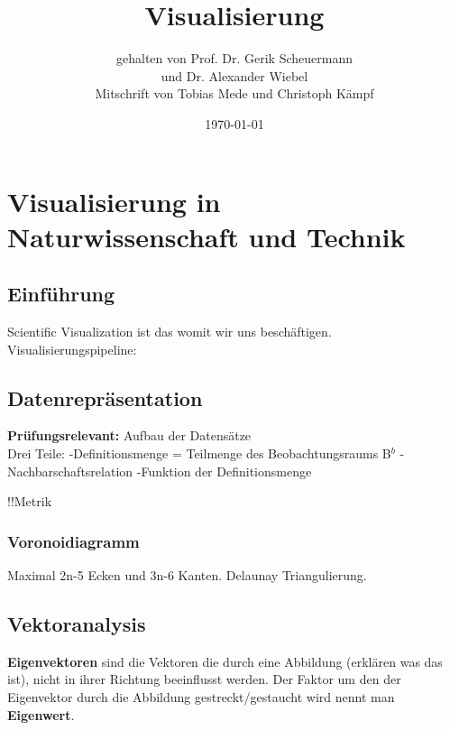 \documentclass[12pt,a4paper,oneside,normalheadings,abstracton,liststotoc,bibtotoc,titlepage,pdftex]{scrbook}
\begin{document}

\titlehead{Universität Leipzig\\Fakultät für Fakultät für Mathematik und Informatik}
\subject{Vorlesungsmitschrift WiSe 2010}
\title{Visualisierung}
\author{gehalten von Prof. Dr. Gerik Scheuermann\\
und Dr. Alexander Wiebel \\
Mitschrift von Tobias Mede und Christoph Kämpf}
\date{\today}

\maketitle[1]


\tableofcontents
\pagebreak


\chapter{Visualisierung in Naturwissenschaft und Technik}

\section{Einführung}
Scientific Visualization ist das womit wir uns beschäftigen.
Visualisierungspipeline:


\section{Datenrepräsentation}
\textbf{Prüfungsrelevant:} Aufbau der Datensätze\\


Drei Teile:
-Definitionsmenge = Teilmenge des Beobachtungsraums B$^b$
-Nachbarschaftsrelation
-Funktion der Definitionsmenge

!!Metrik
\subsection{Voronoidiagramm}
Maximal 2n-5 Ecken und 3n-6 Kanten. Delaunay Triangulierung.

\section{Vektoranalysis}
\textbf{Eigenvektoren} sind die Vektoren die durch eine Abbildung (erklären was das ist), nicht in ihrer Richtung beeinflusst werden. Der Faktor um den der Eigenvektor durch die Abbildung gestreckt/gestaucht wird nennt man \textbf{Eigenwert}.
\end{document}
